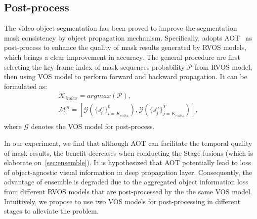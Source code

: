 \documentclass[10pt,twocolumn,letterpaper]{article}
\begin{document}
\subsection{Post-process}
The video object segmentation has been proved to improve the segmentation mask consistency by object propagation mechanism. Specifically, \cite{last_champ} adopts AOT~\cite{aot} as post-process to enhance the quality of mask results generated by RVOS models, which brings a clear improvement in accuracy. The general procedure are first selecting the key-frame index of mask sequences probability $\mathcal{P}$ from RVOS model, then using VOS model to perform forward and backward propagation. It can be formulated as:
\begin{equation}
\begin{gathered}
    \mathcal{K}_{index} = argmax(\mathcal{P}), \\
    \mathcal{M}^n = \left[\mathcal{G}\left(\{s^n_{i}\}_{i=K_{index}}^{0}\right), \mathcal{G}\left(\{s^n_{j}\}_{j=K_{index}}^{T}\right)\right], \\
\end{gathered}
\end{equation}
where $\mathcal{G}$ denotes the VOS model for post-process. 

In our experiment, we find that although AOT can facilitate the temporal quality of mask results, the benefit decreases when conducting the Stage \uppercase\expandafter{} fusions (which is elaborate on~\cref{sec:ensemble}). It is hypothesized that AOT potentially lead to loss of object-agnostic visual information in deep propagation layer. Consequently, the advantage of ensemble is degraded due to the aggregated object information loss from different RVOS models that are post-processed by the the same VOS model. Intuitively, we propose to use two VOS models for post-processing in different stages to alleviate the problem. 
\end{document}
